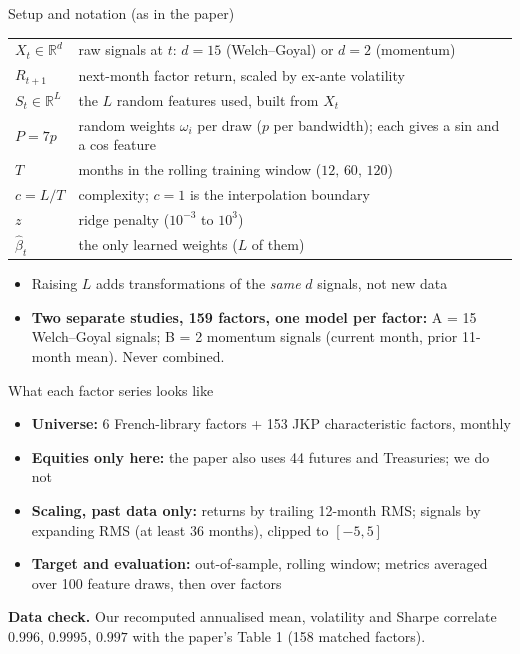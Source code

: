 \documentclass[aspectratio=169,10pt]{beamer}
\newcommand{\R}{\mathbb{R}}
\begin{document}
\begin{frame}{Setup and notation (as in the paper)}
\begin{tabular}{@{}ll@{}}
$X_t\in\R^{d}$ & raw signals at $t$: $d=15$ (Welch--Goyal) or $d=2$ (momentum) \\
$R_{t+1}$ & next-month factor return, scaled by ex-ante volatility \\
$S_t\in\R^{L}$ & the $L$ random features used, built from $X_t$ \\
$P=7p$ & random weights $\omega_i$ per draw ($p$ per bandwidth); each gives a sin and a cos feature \\
$T$ & months in the rolling training window ($12,\,60,\,120$) \\
$c=L/T$ & complexity; $c=1$ is the interpolation boundary \\
$z$ & ridge penalty ($10^{-3}$ to $10^{3}$) \\
$\hat\beta_t$ & the only learned weights ($L$ of them) \\
\end{tabular}
\vspace{6pt}
\begin{itemize}
  \item Raising $L$ adds transformations of the \emph{same} $d$ signals, not new data
  \item \textbf{Two separate studies, 159 factors, one model per factor:} A = 15 Welch--Goyal signals; B = 2 momentum signals (current month, prior 11-month mean). Never combined.
\end{itemize}
\end{frame}

\begin{frame}{What each factor series looks like}
\begin{itemize}
  \item \textbf{Universe:} 6 French-library factors + 153 JKP characteristic factors, monthly
  \item \textbf{Equities only here:} the paper also uses 44 futures and Treasuries; we do not
  \item \textbf{Scaling, past data only:} returns by trailing 12-month RMS; signals by expanding RMS (at least 36 months), clipped to $[-5,5]$
  \item \textbf{Target and evaluation:} out-of-sample, rolling window; metrics averaged over 100 feature draws, then over factors
\end{itemize}
\vspace{6pt}
\textbf{Data check.} Our recomputed annualised mean, volatility and Sharpe correlate $0.996$, $0.9995$, $0.997$ with the paper's Table 1 (158 matched factors).
\end{frame}
\end{document}
